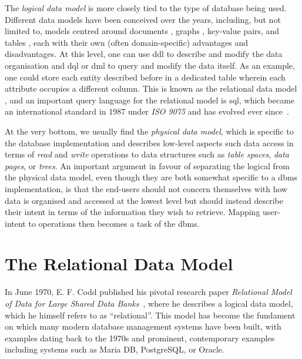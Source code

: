The \emph{logical data model} is more closely tied to the type of database being used. Different data models have been conceived over the years, including, but not limited to, models centred around documents \cite{Hashem:2016Evaluating}, graphs \cite{Angles:2008Survey}, key-value pairs, and tables \cite{Codd:1970Relational}, each with their own (often domain-specific) advantages and disadvantages. At this level, one can use \acrshort{ddl} to describe and modify the data organisation and \acrshort{dql} or \acrshort{dml} to query and modify the data itself. As an example, one could store each entity described before in a dedicated table wherein each attribute occupies a different column. This is known as the relational data model \cite{Codd:1970Relational}, and an important query language for the relational model is \acrfull{sql}, which became an international standard in 1987 under \emph{ISO 9075} and has evolved ever since~\cite{Chamberlin:2012Early}.

At the very bottom, we usually find the \emph{physical data model}, which is specific to the database implementation and describes low-level aspects such data access in terms of \emph{read} and \emph{write} operations to data structures such as \emph{table spaces}, \emph{data pages}, or \emph{trees}. An important argument in favour of separating the logical from the physical data model, even though they are both somewhat specific to a \acrshort{dbms} implementation, is that the end-users should not concern themselves with how data is organised and accessed at the lowest level but should instead describe their intent in terms of the information they wish to retrieve. Mapping user-intent to operations then becomes a task of the \acrshort{dbms}.

\section{The Relational Data Model}
\label{section:relational_data_model}

In June 1970, E. F. Codd published his pivotal research paper \emph{Relational Model of Data for Large Shared Data Banks}~\cite{Codd:1970Relational}, where he describes a logical data model, which he himself refers to as ``relational''. This model has become the fundament on which many modern database management systems have been built, with examples dating back to the 1970s \cite{Astrahan:1976Systemr} and prominent, contemporary examples including systems such as Maria DB, PostgreSQL, or Oracle. 

